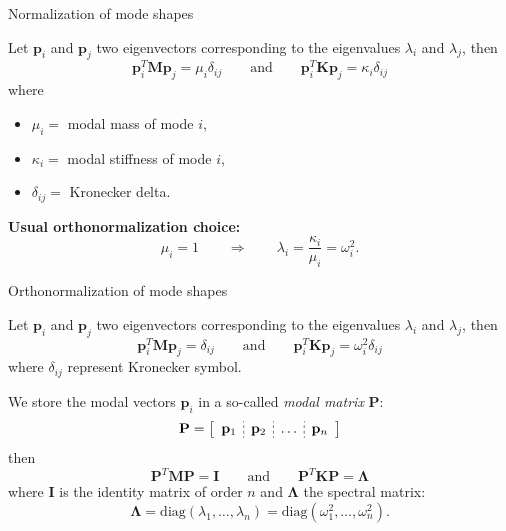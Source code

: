 \documentclass[aspectratio=169]{beamer}
\begin{document}
\begin{frame}{Normalization of mode shapes}

  Let $\mathbf p_i$ and $\mathbf p_j$ two eigenvectors corresponding to the eigenvalues $\lambda_i$ and $\lambda_j$, then
  $$
    \mathbf p_i^T\mathbf M\mathbf p_j  =\mu_i \delta_{ij}
    \qquad\text{and}\qquad
    \mathbf p_i^T\mathbf K\mathbf p_j  =\kappa_i\delta_{ij}
  $$
  where
  \begin{itemize}
    \item $\mu_i=$ modal mass of mode $i$,
    \item $\kappa_i=$ modal stiffness of mode $i$,
    \item $\delta_{ij}=$ Kronecker delta.
  \end{itemize}
  \begin{tcolorbox}[colback=darkred!10,colframe=darkred!40!black]
    \textbf{Usual orthonormalization choice: }
    \[
      \mu_i = 1 \qquad  \Rightarrow \qquad \lambda_i = \frac{\kappa_i}{\mu_i} = \omega_i^2.
    \]
  \end{tcolorbox}
\end{frame}

{
\color{white}
\begin{frame}{Orthonormalization of mode shapes}
  \vspace{-0.2cm}
  \begin{block}{}
    Let $\mathbf p_i$ and $\mathbf p_j$ two eigenvectors corresponding to the  eigenvalues $\lambda_i$ and $\lambda_j$, then
    $$
      \mathbf p_i^T\mathbf M\mathbf p_j  =\delta_{ij}
      \qquad\text{and}\qquad
      \mathbf p_i^T\mathbf K\mathbf p_j  =\omega_i^2\delta_{ij}
    $$
    where $\delta_{ij}$ represent Kronecker symbol.
  \end{block}
  \vspace{-0.3cm}
  \begin{tcolorbox}[colback=darkred!10,colframe=darkred!40!black]
    We store the modal vectors $\mathbf p_i$ in a so-called \emph{modal matrix} $\mathbf P$:
    $$\mathbf P=\left[ \begin{array}{c;{2pt/2pt}c;{2pt/2pt}c;{2pt/2pt}c}
          \mathbf p_{1} & \mathbf p_{2} & \dots & \mathbf p_{n} \\
        \end{array}\right]$$
    then
    $$  \mathbf P^T\mathbf M\mathbf P  =\mathbf I       \qquad\text{and}\qquad
      \mathbf P^T\mathbf K\mathbf P  =\mathbf\Lambda$$
    where $\mathbf I$ is the identity matrix of order $n$ and $\mathbf\Lambda$ the spectral matrix:
    $$\mathbf\Lambda=\text{diag}(\lambda_1,\dots,\lambda_n)=\text{diag}(\omega_1^2,\dots,\omega_n^2).$$
  \end{tcolorbox}
\end{frame}
}
\end{document}
